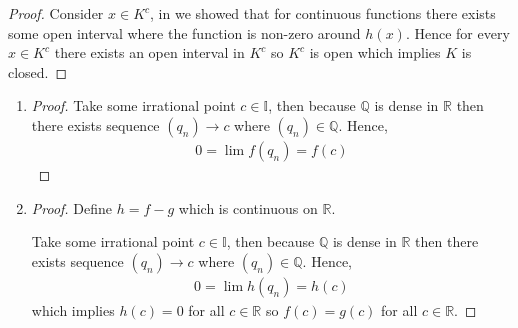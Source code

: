 \begin{proof}
    Consider $x\in K^c$, in  we showed that for continuous functions there
    exists some open interval where the function is non-zero around $h(x)$.
    Hence for every $x\in K^c$ there exists an open interval in $K^c$ so 
    $K^c$ is open which implies $K$ is closed.
\end{proof}

\begin{enumerate}[label=(\alph*)]
    \item 
    \begin{proof}
        Take some irrational point $c\in \mathbb{I}$, then because $\mathbb{Q}$
        is dense in $\mathbb{R}$ then there exists sequence $(q_n)\rightarrow c$
        where $(q_n) \in \mathbb{Q}$. Hence,
        \begin{align*}
            0 = \lim f(q_n) = f(c)
        \end{align*}
    \end{proof}

    \item 
    \begin{proof}
        Define $h = f-g$ which is continuous on $\mathbb{R}$. 

        Take some irrational point $c\in \mathbb{I}$, then because $\mathbb{Q}$
        is dense in $\mathbb{R}$ then there exists sequence $(q_n)\rightarrow c$
        where $(q_n) \in \mathbb{Q}$. Hence,
        \begin{align*}
            0 = \lim h(q_n) = h(c)
        \end{align*}
        which implies $h(c)=0$ for all $c\in \mathbb{R}$ so $f(c)=g(c)$ for all 
        $c\in \mathbb{R}$.
    \end{proof}
\end{enumerate}

